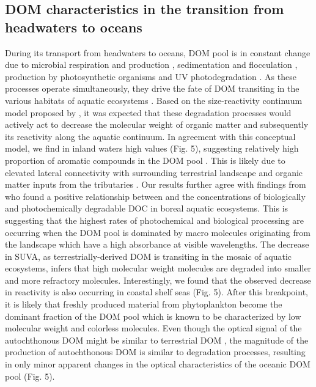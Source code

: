 \subsection*{DOM characteristics in the transition from headwaters to oceans}

During its transport from headwaters to oceans, DOM pool is in constant change due to microbial respiration and production \citep{DelGiorgio1997, Kritzberg2006a, Berggren2010}, sedimentation and flocculation \citep{Sholkovitz1976,VonWachenfeldt2008}, production by photosynthetic organisms \citep{Descy2002, Kritzberg2005, Lapierre2009} and UV photodegradation \citep{Benner1999, Amado2006, Zhang2009}. As these processes operate simultaneously, they drive the fate of DOM transiting in the various habitats of aquatic ecosystems \citep{Sondergaard2004, Massicotte2013LOFE}. Based on the size-reactivity continuum model proposed by \citet{Amon1996}, it was expected that these degradation processes would actively act to decrease the molecular weight of organic matter and subsequently its reactivity along the aquatic continuum. In agreement with this conceptual model, we find in inland waters high  values (Fig. 5), suggesting relatively high proportion of aromatic compounds in the DOM pool \citep{Weishaar2003}. This is likely due to elevated lateral connectivity with surrounding terrestrial landscape and organic matter inputs from the tributaries \citep{Massicotte2011EA, Lambert2016}. Our results further agree with findings from \citet{Lapierre2013} who found a positive relationship between  and the concentrations of biologically and photochemically degradable DOC in boreal aquatic ecosystems. This is suggesting that the highest rates of photochemical and biological processing are occurring when the DOM pool is dominated by macro molecules originating from the landscape which have a high absorbance at visible wavelengths. The decrease in SUVA, as terrestrially-derived DOM is transiting in the mosaic of aquatic ecosystems, infers that high molecular weight molecules are degraded into smaller and more refractory molecules. Interestingly, we found that the observed decrease in reactivity is also occurring in coastal shelf seas (Fig. 5). After this breakpoint, it is likely that freshly produced material from phytoplankton become the dominant fraction of the DOM pool which is known to be characterized by low molecular weight and colorless molecules. Even though the optical signal of the autochthonous DOM might be similar to terrestrial DOM \citep{Yamashita2004}, the magnitude of the production of autochthonous DOM is similar to degradation processes, resulting in only minor apparent changes in the optical characteristics of the oceanic DOM pool (Fig. 5).

